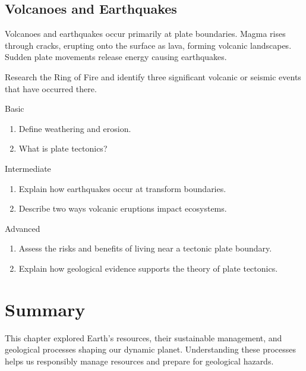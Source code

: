 \subsection{Volcanoes and Earthquakes}

Volcanoes and earthquakes occur primarily at plate boundaries. Magma rises through cracks, erupting onto the surface as lava, forming volcanic landscapes. Sudden plate movements release energy causing earthquakes.

\begin{challenge}{Research the Ring of Fire and identify three significant volcanic or seismic events that have occurred there.}
\end{challenge}

\begin{tieredquestions}{Basic}
\begin{enumerate}
    \item Define weathering and erosion.
    \item What is plate tectonics?
\end{enumerate}
\end{tieredquestions}

\begin{tieredquestions}{Intermediate}
\begin{enumerate}
    \item Explain how earthquakes occur at transform boundaries.
    \item Describe two ways volcanic eruptions impact ecosystems.
\end{enumerate}
\end{tieredquestions}

\begin{tieredquestions}{Advanced}
\begin{enumerate}
    \item Assess the risks and benefits of living near a tectonic plate boundary.
    \item Explain how geological evidence supports the theory of plate tectonics.
\end{enumerate}
\end{tieredquestions}

\section{Summary}

This chapter explored Earth's resources, their sustainable management, and geological processes shaping our dynamic planet. Understanding these processes helps us responsibly manage resources and prepare for geological hazards.